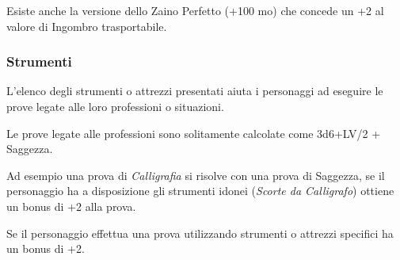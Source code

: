 \medskip

Esiste anche la versione dello Zaino Perfetto (+100 mo) che concede un +2 al valore di Ingombro trasportabile.

\begin{multicols}{2}

\subsubsection{Strumenti}

L'elenco degli strumenti o attrezzi presentati aiuta i personaggi ad eseguire le prove legate alle loro professioni o situazioni.

Le prove legate alle professioni sono solitamente calcolate come 3d6+LV/2 + Saggezza.

Ad esempio una prova di \emph{Calligrafia} si risolve con una prova di Saggezza, se il personaggio ha a disposizione gli strumenti idonei (\emph{Scorte da Calligrafo}) ottiene un bonus di +2 alla prova.

Se il personaggio effettua una prova utilizzando strumenti o attrezzi specifici ha un bonus di +2.

\end{multicols}

\medskip

